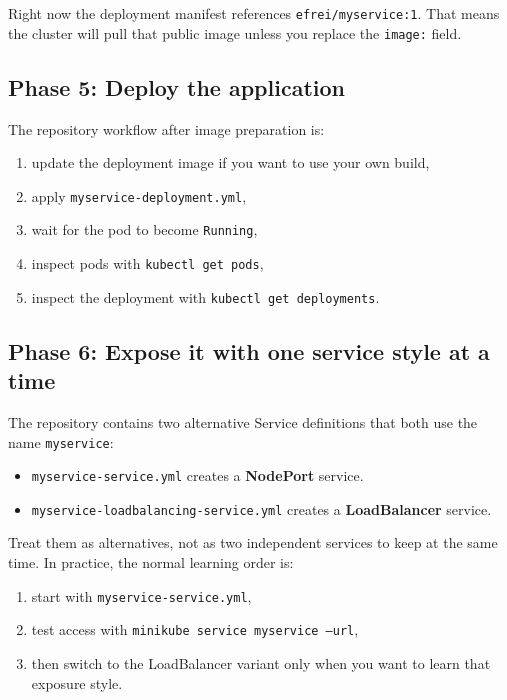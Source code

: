 \documentclass[11pt,a4paper]{article}
\newcommand{\pathitem}[1]{\texorpdfstring{\nolinkurl{#1}}{#1}}
\newcommand{\cmd}[1]{\texttt{#1}}
\begin{document}
Right now the deployment manifest references \cmd{efrei/myservice:1}. That means the cluster will pull that public image unless you replace the \cmd{image:} field.

\subsection{Phase 5: Deploy the application}

The repository workflow after image preparation is:

\begin{enumerate}
\item update the deployment image if you want to use your own build,
\item apply \pathitem{myservice-deployment.yml},
\item wait for the pod to become \cmd{Running},
\item inspect pods with \cmd{kubectl get pods},
\item inspect the deployment with \cmd{kubectl get deployments}.
\end{enumerate}

\subsection{Phase 6: Expose it with one service style at a time}

The repository contains two alternative Service definitions that both use the name \cmd{myservice}:

\begin{itemize}
\item \pathitem{myservice-service.yml} creates a \textbf{NodePort} service.
\item \pathitem{myservice-loadbalancing-service.yml} creates a \textbf{LoadBalancer} service.
\end{itemize}

Treat them as alternatives, not as two independent services to keep at the same time. In practice, the normal learning order is:

\begin{enumerate}
\item start with \pathitem{myservice-service.yml},
\item test access with \cmd{minikube service myservice --url},
\item then switch to the LoadBalancer variant only when you want to learn that exposure style.
\end{enumerate}
\end{document}
